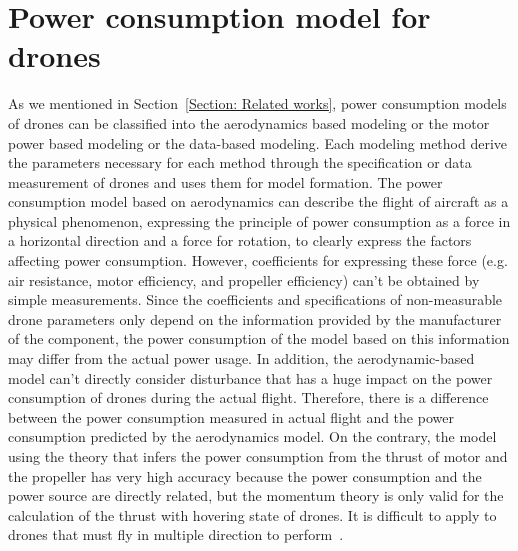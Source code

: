 \documentclass[journal]{./template/IEEEtran}
\begin{document}
\section{Power consumption model for drones}
\label{Section: Power consumption model for drones}
As we mentioned in Section~\ref{Section: Related works}, power consumption models of drones can be classified into the aerodynamics based modeling or the motor power based modeling or the data-based modeling. 
Each modeling method derive the parameters necessary for each method through the specification or data measurement of drones and uses them for model formation.
The power consumption model based on aerodynamics can describe the flight of aircraft as a physical phenomenon, expressing the principle of power consumption as a force in a horizontal direction and a force for rotation, to clearly express the factors affecting power consumption. 
However, coefficients for expressing these force (e.g. air resistance, motor efficiency, and propeller efficiency) can’t be obtained by simple measurements. 
Since the coefficients and specifications of non-measurable drone parameters only depend on the information provided by the manufacturer of the component, the power consumption of the model based on this information may differ from the actual power usage.
In addition, the aerodynamic-based model can’t directly consider disturbance that has a huge impact on the power consumption of drones during the actual flight.
Therefore, there is a difference between the power consumption measured in actual flight and the power consumption predicted by the aerodynamics model.
On the contrary, the model using the theory that infers the power consumption from the thrust of motor and the propeller has very high accuracy because the power consumption and the power source are directly related, but the momentum theory is only valid for the calculation of the thrust with hovering state of drones. 
It is difficult to apply to drones that must fly in multiple direction to perform~\cite{ref_4}.
\end{document}
